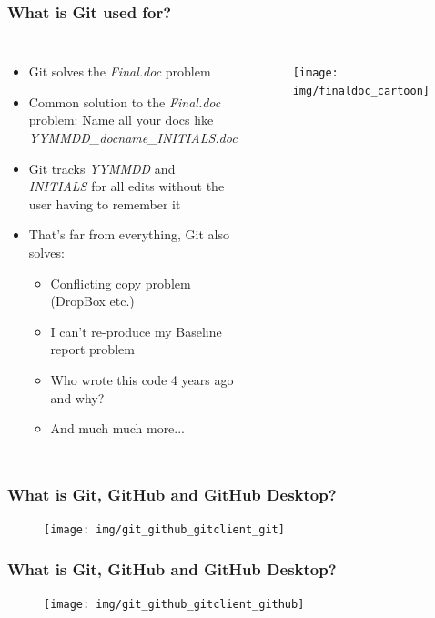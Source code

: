 \documentclass[aspectratio=169]{beamer}
\begin{document}
\begin{frame}
\frametitle{What is Git used for?}

	\begin{columns}[c]

		\begin{itemize}
			\item Git solves the \textit{Final.doc} problem
			\item <2->Common solution to the \textit{Final.doc} problem: Name all your docs like \textit{YYMMDD\_docname\_INITIALS.doc}
			\item <3->Git tracks \textit{YYMMDD} and \textit{INITIALS} for all edits  without the user having to remember it
			\item <4->That's far from everything, Git also solves:
			\begin{itemize}
				\item <4->Conflicting copy problem (DropBox etc.)
				\item <4->I can't re-produce my Baseline report problem
				\item <4->Who wrote this code 4 years ago and why?
				\item <4->And much much more...
			\end{itemize}
		\end{itemize}

		\begin{figure}
			\centering
			\texttt{[image: img/finaldoc\_cartoon]}
			\label{fig:finaldoccartoon}
		\end{figure}

	\end{columns}
\end{frame}


\begin{frame}
	\frametitle{What is Git, GitHub and GitHub Desktop?}
	\begin{figure}
		\centering
		\texttt{[image: img/git\_github\_gitclient\_git]}
		\label{fig:gitgithubgitclient_git}
	\end{figure}
\end{frame}

\begin{frame}
	\frametitle{What is Git, GitHub and GitHub Desktop?}
	\begin{figure}
		\centering
		\texttt{[image: img/git\_github\_gitclient\_github]}
		\label{fig:gitgithubgitclient_github}
	\end{figure}
\end{frame}
\end{document}
